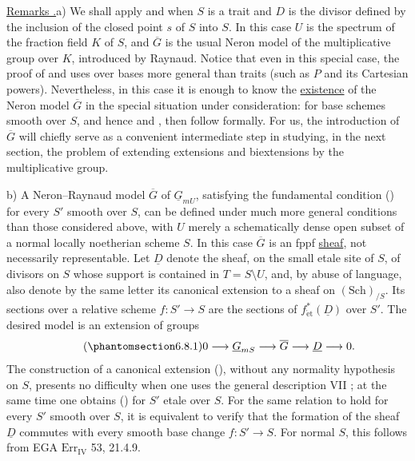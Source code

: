 
\medskip
\noindent\underline{Remarks .}\quad a) We shall apply  and  when
$S$ is a trait and $D$ is the divisor defined by the inclusion of the closed
point $s$ of $S$ into $S$.  In this case $U$ is the spectrum of the fraction
field $K$ of $S$, and $\overline G$ is the usual Neron model of the
multiplicative group over $K$, introduced by Raynaud.  Notice that even in
this special case, the proof of  and  uses  over bases more general
than traits (such as $P$ and its Cartesian powers).  Nevertheless, in this
case it is enough to know the \underline{existence} of the Neron model
$\overline G$ in the special situation under consideration:  for base
schemes smooth over $S$, and hence  and , then follow formally.  For
us, the introduction of $\overline G$ will chiefly serve as a convenient
intermediate step in studying, in the next section, the problem of extending
extensions and biextensions by the multiplicative group.

\smallskip
\noindent b) A Neron--Raynaud model $\overline G$ of
$\underline G_{mU}$, satisfying the fundamental condition () for every
$S'$ smooth over $S$, can be defined under much more general conditions than
those considered above, with $U$ merely a schematically dense open subset
of a normal locally noetherian scheme $S$.  In this case $\overline G$ is an
fppf \underline{sheaf}, not necessarily representable.  Let $\underline D$
denote the sheaf, on the small etale site of $S$, of divisors on $S$ whose
support is contained in $T=S\setminus U$, and, by abuse of language, also
denote by the same letter its canonical extension to a sheaf on
$(\mathrm{Sch})_{/S}$.  Its sections over a relative scheme
$f:S'\to S$ are the sections of $f_{\mathrm{\acute{e}t}}^*(\underline D)$
over $S'$.  The desired model is an extension of groups
\begin{equation}\tag{\SGARefTarget{sga7.sga7i.eviii.n6-8-1}{6.8.1}}
 0\longrightarrow\underline G_{mS}\longrightarrow\overline G
 \longrightarrow\underline D\longrightarrow0.
\end{equation}
The construction of a canonical extension (), without any normality
hypothesis on $S$, presents no difficulty when one uses the general
description VII ; at the same time one obtains () for $S'$ etale
over $S$.  For the same relation to hold for every $S'$ smooth over $S$, it
is equivalent to verify that the formation of the sheaf $\underline D$
commutes with every smooth base change $f:S'\to S$.  For normal $S$, this
follows from EGA $\mathrm{Err}_{\mathrm{IV}}$ 53, 21.4.9.

